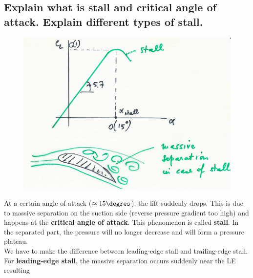 \documentclass[british,french,11pt, a4paper, openany]{article}
\begin{document}
\subsection{Explain what is stall and critical angle of attack. Explain different types of stall.}
\begin{figure}
	\vspace{-5mm}
	\includegraphics[scale=0.16]{ch2/18}
\end{figure}
At a certain angle of attack ($\approx 15\degres$), the lift suddenly drops. This is due to massive separation on the suction side (reverse pressure gradient too high) and happens at the \textbf{critical angle of attack}. This phenomenon is called \textbf{stall}. In the separated part, the pressure will no longer decrease and will form a pressure plateau. \\

We have to make the difference between leading-edge stall and trailing-edge stall. For \textbf{leading-edge stall}, the massive separation occurs suddenly near the LE resulting 
\end{document}
